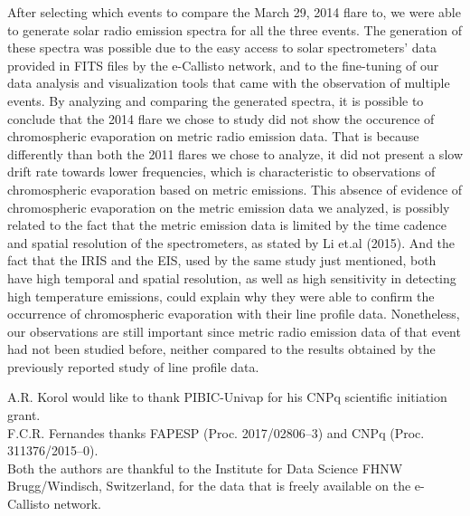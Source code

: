 \documentclass[a0paper,portrait]{baposter}
\begin{document}
\begin{poster}
{After selecting which events to compare the March 29, 2014 flare to, we were able to generate solar radio emission
    spectra for all the three events. The generation of these spectra was possible due to the easy access to solar
    spectrometers' data provided in FITS files by the e-Callisto network, and to the fine-tuning of our data analysis
    and visualization tools that came with the observation of multiple events.
    By analyzing and comparing the generated spectra, it is possible to conclude
    that the 2014 flare we chose to study did not show the occurence of chromospheric evaporation on metric radio
    emission data. That is because differently than both the 2011 flares we chose to analyze, it did not present
    a slow drift rate towards lower frequencies, which is characteristic to observations of chromospheric evaporation
    based on metric emissions. This absence of evidence of chromospheric evaporation on the metric emission data we
    analyzed, is possibly related to the fact that the metric emission data is limited by the time cadence and
    spatial resolution of the spectrometers, as stated by Li et.al (2015). And the fact that the IRIS and the EIS,
    used by the same study just mentioned, both have high temporal and spatial resolution, as well as high sensitivity
    in detecting high temperature emissions, could explain why they were able to confirm the occurrence of chromospheric
    evaporation with their line profile data. Nonetheless, our observations are still important since metric radio emission
    data of that event had not been studied before, neither compared to the results obtained by the previously reported
    study of line profile data.
}

{A.R. Korol would like to thank PIBIC-Univap for his CNPq scientific initiation grant.\\
    F.C.R. Fernandes thanks FAPESP (Proc. 2017/02806--3) and CNPq (Proc. 311376/2015--0).\\
    Both the authors are thankful to the Institute for Data Science FHNW Brugg/Windisch, Switzerland,
    for the data that is freely available on the e-Callisto network.
}


\end{poster}
\end{document}
